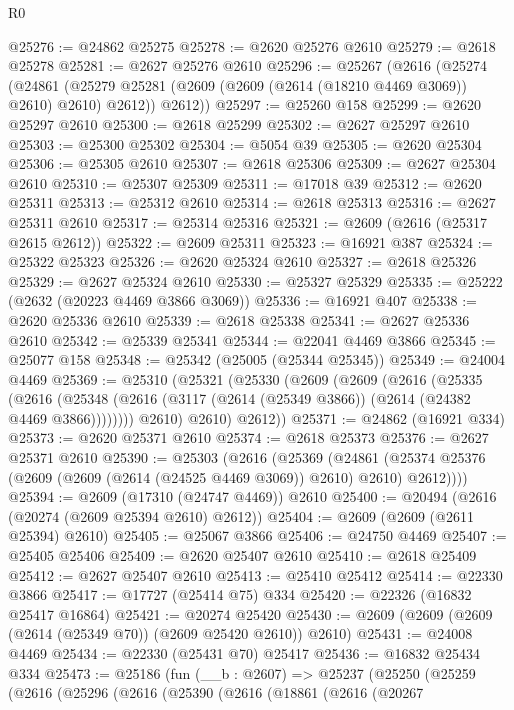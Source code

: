 \begin{lexlean}{R0}
\begin{coremodule}
@25276 := @24862 @25275
@25278 := @2620 @25276 @2610
@25279 := @2618 @25278
@25281 := @2627 @25276 @2610
@25296 := @25267
    (@2616
      (@25274
        (@24861 (@25279 @25281 (@2609 (@2609 (@2614 (@18210 @4469 @3069)) @2610) @2610) @2612))
        @2612))
@25297 := @25260 @158
@25299 := @2620 @25297 @2610
@25300 := @2618 @25299
@25302 := @2627 @25297 @2610
@25303 := @25300 @25302
@25304 := @5054 @39
@25305 := @2620 @25304
@25306 := @25305 @2610
@25307 := @2618 @25306
@25309 := @2627 @25304 @2610
@25310 := @25307 @25309
@25311 := @17018 @39
@25312 := @2620 @25311
@25313 := @25312 @2610
@25314 := @2618 @25313
@25316 := @2627 @25311 @2610
@25317 := @25314 @25316
@25321 := @2609 (@2616 (@25317 @2615 @2612))
@25322 := @2609 @25311
@25323 := @16921 @387
@25324 := @25322 @25323
@25326 := @2620 @25324 @2610
@25327 := @2618 @25326
@25329 := @2627 @25324 @2610
@25330 := @25327 @25329
@25335 := @25222 (@2632 (@20223 @4469 @3866 @3069))
@25336 := @16921 @407
@25338 := @2620 @25336 @2610
@25339 := @2618 @25338
@25341 := @2627 @25336 @2610
@25342 := @25339 @25341
@25344 := @22041 @4469 @3866
@25345 := @25077 @158
@25348 := @25342 (@25005 (@25344 @25345))
@25349 := @24004 @4469
@25369 := @25310
    (@25321
      (@25330
        (@2609
          (@2609
            (@2616
              (@25335
                (@2616
                  (@25348 (@2616 (@3117 (@2614 (@25349 @3866)) (@2614 (@24382 @4469 @3866))))))))
            @2610)
          @2610)
        @2612))
@25371 := @24862 (@16921 @334)
@25373 := @2620 @25371 @2610
@25374 := @2618 @25373
@25376 := @2627 @25371 @2610
@25390 := @25303
    (@2616
      (@25369
        (@24861 (@25374 @25376 (@2609 (@2609 (@2614 (@24525 @4469 @3069)) @2610) @2610) @2612))))
@25394 := @2609 (@17310 (@24747 @4469)) @2610
@25400 := @20494 (@2616 (@20274 (@2609 @25394 @2610) @2612))
@25404 := @2609 (@2609 (@2611 @25394) @2610)
@25405 := @25067 @3866
@25406 := @24750 @4469
@25407 := @25405 @25406
@25409 := @2620 @25407 @2610
@25410 := @2618 @25409
@25412 := @2627 @25407 @2610
@25413 := @25410 @25412
@25414 := @22330 @3866
@25417 := @17727 (@25414 @75) @334
@25420 := @22326 (@16832 @25417 @16864)
@25421 := @20274 @25420
@25430 := @2609 (@2609 (@2609 (@2614 (@25349 @70)) (@2609 @25420 @2610)) @2610)
@25431 := @24008 @4469
@25434 := @22330 (@25431 @70) @25417
@25436 := @16832 @25434 @334
@25473 := @25186
    (fun (__b : @2607) =>
    @25237
      (@25250
        (@25259
          (@2616
            (@25296
              (@2616
                (@25390
                  (@2616
                    (@18861
                      (@2616
                        (@20267

\end{coremodule}
\end{lexlean}
